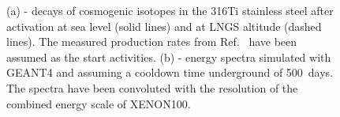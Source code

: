 \begin{figure}[!h]
\centering
{}
\caption[Decays of cosmogenic isotopes in the 316Ti stainless steel after activation at sea level and at LNGS altitude, and the energy spectra after cooldown of 500~days]{(a) - decays of cosmogenic isotopes in the 316Ti stainless steel after activation at sea level (solid lines) and at LNGS altitude (dashed lines). The measured production rates from Ref.~\cite{SteelCosmogenics} have been assumed as the start activities. (b) - energy spectra simulated with GEANT4 and assuming a cooldown time underground of 500~days. The spectra have been convoluted with the resolution of the combined energy scale of XENON100.}
\label{figCosmogenicsSteelDecays}
\end{figure}



